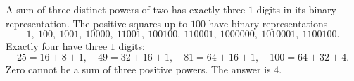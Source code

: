 A sum of three distinct powers of two has exactly three $1$ digits in its binary representation. The positive squares up to $100$ have binary representations\[1,\ 100,\ 1001,\ 10000,\ 11001,\ 100100,\ 110001,\ 1000000,\ 1010001,\ 1100100.\] Exactly four have three $1$ digits:\[25=16+8+1,\quad49=32+16+1,\quad81=64+16+1,\quad100=64+32+4.\] Zero cannot be a sum of three positive powers. The answer is $\boxed4$.
